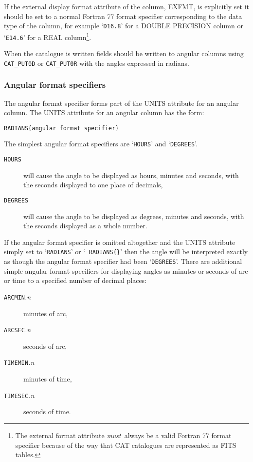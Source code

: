 If the external display format attribute of the column, EXFMT,
is explicitly set it should be set to a normal Fortran 77 format
specifier corresponding to the data type of the column, for
example `{\tt D16.8}' for a DOUBLE PRECISION column or `{\tt E14.6}'
for a REAL column\footnote{The external format attribute {\it
must}\, always be a valid Fortran 77 format specifier because of
the way that CAT catalogues are represented as FITS tables.}.

When the catalogue is written fields should be written to
angular columns using {\tt CAT\_PUT0D} or {\tt CAT\_PUT0R} with
the angles expressed in radians.

\subsubsection{Angular format specifiers}

The angular format specifier forms part of the UNITS attribute for an
angular column. The UNITS attribute for an angular column has the
form:

\begin{center}
{\tt RADIANS\{angular format specifier\} }
\end{center}

The simplest angular format specifiers are `{\tt HOURS}' and
`{\tt DEGREES}'.

\begin{description}

  \item[{\tt HOURS}] will cause the angle to be displayed as
   hours, minutes and seconds, with the seconds displayed to one
   place of decimals,

  \item[{\tt DEGREES}] will cause the angle to be displayed as
   degrees, minutes and seconds, with the seconds displayed as a
   whole number.

\end{description}

If the angular format specifier is omitted altogether and
the UNITS attribute simply set to `{\tt RADIANS}' or `{\tt
RADIANS\{\}}' then the angle will be interpreted exactly as
though the angular format specifier had been `{\tt DEGREES}'.
There are additional simple angular format specifiers for displaying
angles as minutes or seconds of arc or time to a specified number of
decimal places:

\begin{description}

  \item[{\tt ARCMIN}{\it .n}] minutes of arc,

  \item[{\tt ARCSEC}{\it .n}] seconds of arc,

  \item[{\tt TIMEMIN}{\it .n}] minutes of time,

  \item[{\tt TIMESEC}{\it .n}] seconds of time.


\end{description}

